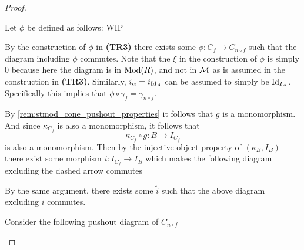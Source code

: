 \begin{proof}
\begin{enumerate}[label={(\bfseries TR\arabic*)}]
{            Let \( \phi \) be defined as follows: WIP

            By the construction of \( \phi \) in {\bf (TR3)} there exists some \( \phi: C_f \to C_{n \circ f} \) such that the diagram including \( \phi \) commutes. Note that the \( \xi \) in the construction of \( \phi \) is simply \( 0 \) because here the diagram is in \( \operatorname{Mod}(R) \), and not in \( {\mathcal{M}} \) as is assumed in the construction in {\bf (TR3)}. Similarly, \( i_\alpha = i_{\operatorname{Id}_A} \) can be assumed to simply be \( \operatorname{Id}_{I_A} \). Specifically this implies that \( \phi \circ \gamma_f = \gamma_{n \circ f} \).

            By \autoref{rem:stmod_cone_pushout_properties} it follows that \( g \) is a monomorphism. And since \( \kappa_{C_f} \) is also a monomorphism, it follows that
            \[
                \kappa_{C_f} \circ g: B \to I_{C_f}
            \]
            is also a monomorphism. Then by the injective object property of \( (\kappa_B, I_B) \) there exist some morphism \( i: I_{C_f} \to I_B \) which makes the following diagram excluding the dashed arrow commutes
            \begin{center}
            \end{center}
            By the same argument, there exists some \( \tilde{i} \) such that the above diagram excluding \( i \) commutes.
            
            Consider the following pushout diagram of \( C_{n \circ f} \)
            \begin{center}
\end{center}}
\end{enumerate}
\end{proof}
